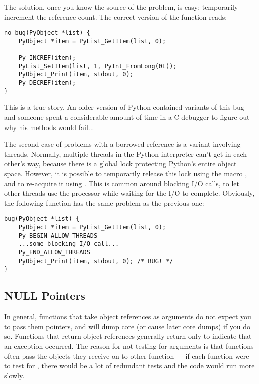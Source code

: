 The solution, once you know the source of the problem, is easy:
temporarily increment the reference count.  The correct version of the
function reads:

\begin{verbatim}
no_bug(PyObject *list) {
    PyObject *item = PyList_GetItem(list, 0);

    Py_INCREF(item);
    PyList_SetItem(list, 1, PyInt_FromLong(0L));
    PyObject_Print(item, stdout, 0);
    Py_DECREF(item);
}
\end{verbatim}

This is a true story.  An older version of Python contained variants
of this bug and someone spent a considerable amount of time in a C
debugger to figure out why his  methods would fail...

The second case of problems with a borrowed reference is a variant
involving threads.  Normally, multiple threads in the Python
interpreter can't get in each other's way, because there is a global
lock protecting Python's entire object space.  However, it is possible
to temporarily release this lock using the macro
, and to re-acquire it using
.  This is common around blocking I/O
calls, to let other threads use the processor while waiting for the I/O to
complete.  Obviously, the following function has the same problem as
the previous one:

\begin{verbatim}
bug(PyObject *list) {
    PyObject *item = PyList_GetItem(list, 0);
    Py_BEGIN_ALLOW_THREADS
    ...some blocking I/O call...
    Py_END_ALLOW_THREADS
    PyObject_Print(item, stdout, 0); /* BUG! */
}
\end{verbatim}


\subsection{NULL Pointers
            \label{nullPointers}}

In general, functions that take object references as arguments do not
expect you to pass them \NULL{} pointers, and will dump core (or
cause later core dumps) if you do so.  Functions that return object
references generally return \NULL{} only to indicate that an
exception occurred.  The reason for not testing for \NULL{}
arguments is that functions often pass the objects they receive on to
other function --- if each function were to test for \NULL,
there would be a lot of redundant tests and the code would run more
slowly.

